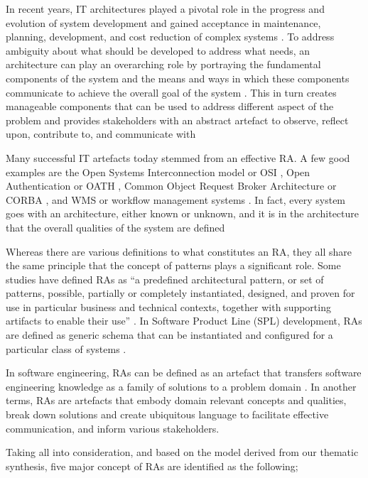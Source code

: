 \documentclass{ieeeaccess}
\begin{document}
In recent years, IT architectures played a pivotal role in the progress and evolution of system development and gained acceptance in maintenance, planning, development, and cost reduction of complex systems \cite{martinez2015solid}. To address ambiguity about what should be developed to address what needs, an architecture can play an overarching role by portraying the fundamental components of the system and the means and ways in which these components communicate to achieve the overall goal of the system \cite{Sievi-Korte}. This in turn creates manageable components that can be used to address different aspect of the problem and provides stakeholders with an abstract artefact to observe, reflect upon, contribute to, and communicate with \cite{kohler2019towards}

Many successful IT artefacts today stemmed from an effective RA. A few good examples are the Open Systems Interconnection model or OSI \cite{zimmermann1980osi}, Open Authentication or OATH \cite{OATH}, Common Object Request Broker Architecture or CORBA \cite{pope1998corba}, and WMS or workflow management systems \cite{greefhorst1999een}. In fact, every system goes with an architecture, either known or unknown, and it is in the architecture that the overall qualities of the system are defined

Whereas there are various definitions to what constitutes an RA, they all share the same principle that the concept of patterns plays a significant role. Some studies have defined RAs as “a predefined architectural pattern, or set of patterns, possible, partially or completely instantiated, designed, and proven for use in particular business and technical contexts, together with supporting artifacts to enable their use” \cite{Cloutier}. In Software Product Line (SPL) development, RAs are defined as generic schema that can be instantiated and configured for a particular class of systems \cite{Derras}.

In software engineering, RAs can be defined as an artefact that transfers software engineering knowledge as a family of solutions to a problem domain \cite{Klein}. In another terms, RAs are artefacts that embody domain relevant concepts and qualities, break down solutions and create ubiquitous language to facilitate effective communication, and inform various stakeholders. 

Taking all into consideration, and based on the model derived from our thematic synthesis, five major concept of RAs are identified as the following; 
\end{document}
